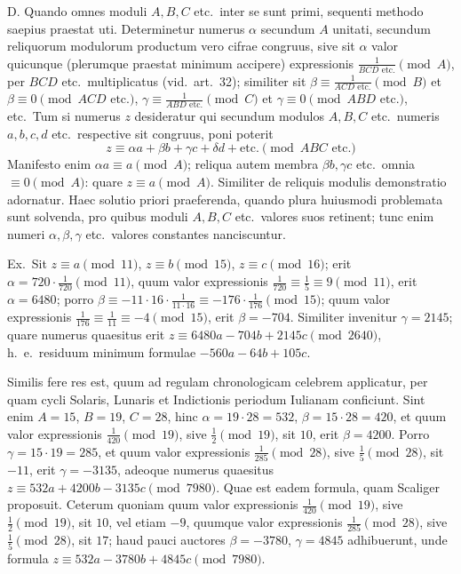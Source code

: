 \documentclass[12pt,a4paper]{article}
\theoremstyle{plain}
\theoremstyle{definition}
\theoremstyle{remark}
\begin{document}
D. Quando omnes moduli $A, B, C$ etc.\ inter se sunt primi, sequenti methodo saepius praestat uti. Determinetur numerus $\alpha$ secundum $A$ unitati, secundum reliquorum modulorum productum vero cifrae congruus, sive sit $\alpha$ valor quicunque (plerumque praestat minimum accipere) expressionis $\frac{1}{BCD \text{ etc.}} \pmod{A}$, per $BCD$ etc.\ multiplicatus (vid.\ art.~32); similiter sit $\beta \equiv \frac{1}{ACD \text{ etc.}} \pmod{B}$ et $\beta \equiv 0 \pmod{ACD \text{ etc.}}$, $\gamma \equiv \frac{1}{ABD \text{ etc.}} \pmod{C}$ et $\gamma \equiv 0 \pmod{ABD \text{ etc.}}$, etc.\ Tum si numerus $z$ desideratur qui secundum modulos $A, B, C$ etc.\ numeris $a, b, c, d$ etc.\ respective sit congruus, poni poterit
\[
z \equiv \alpha a + \beta b + \gamma c + \delta d + \text{etc.} \pmod{ABC \text{ etc.}}
\]
Manifesto enim $\alpha a \equiv a \pmod{A}$; reliqua autem membra $\beta b, \gamma c$ etc.\ omnia $\equiv 0 \pmod{A}$: quare $z \equiv a \pmod{A}$. Similiter de reliquis modulis demonstratio adornatur. Haec solutio priori praeferenda, quando plura huiusmodi problemata sunt solvenda, pro quibus moduli $A, B, C$ etc.\ valores suos retinent; tunc enim numeri $\alpha, \beta, \gamma$ etc.\ valores constantes nanciscuntur.

Ex.\ Sit $z \equiv a \pmod{11}$, $z \equiv b \pmod{15}$, $z \equiv c \pmod{16}$; erit $\alpha = 720 \cdot \frac{1}{720} \pmod{11}$, quum valor expressionis $\frac{1}{720} \equiv \frac{1}{5} \equiv 9 \pmod{11}$, erit $\alpha = 6480$; porro $\beta \equiv -11 \cdot 16 \cdot \frac{1}{11 \cdot 16} \equiv -176 \cdot \frac{1}{176} \pmod{15}$; quum valor expressionis $\frac{1}{176} \equiv \frac{1}{11} \equiv -4 \pmod{15}$, erit $\beta = -704$. Similiter invenitur $\gamma = 2145$; quare numerus quaesitus erit $z \equiv 6480a - 704b + 2145c \pmod{2640}$, h.~e.\ residuum minimum formulae $-560a - 64b + 105c$.

Similis fere res est, quum ad regulam chronologicam celebrem applicatur, per quam cycli Solaris, Lunaris et Indictionis periodum Iulianam conficiunt. Sint enim $A = 15$, $B = 19$, $C = 28$, hinc $\alpha = 19 \cdot 28 = 532$, $\beta = 15 \cdot 28 = 420$, et quum valor expressionis $\frac{1}{420} \pmod{19}$, sive $\frac{1}{2} \pmod{19}$, sit $10$, erit $\beta = 4200$. Porro $\gamma = 15 \cdot 19 = 285$, et quum valor expressionis $\frac{1}{285} \pmod{28}$, sive $\frac{1}{5} \pmod{28}$, sit $-11$, erit $\gamma = -3135$, adeoque numerus quaesitus $z \equiv 532a + 4200b - 3135c \pmod{7980}$. Quae est eadem formula, quam Scaliger proposuit. Ceterum quoniam quum valor expressionis $\frac{1}{420} \pmod{19}$, sive $\frac{1}{2} \pmod{19}$, sit $10$, vel etiam $-9$, quumque valor expressionis $\frac{1}{285} \pmod{28}$, sive $\frac{1}{5} \pmod{28}$, sit $17$; haud pauci auctores $\beta = -3780$, $\gamma = 4845$ adhibuerunt, unde formula $z \equiv 532a - 3780b + 4845c \pmod{7980}$.
\end{document}
